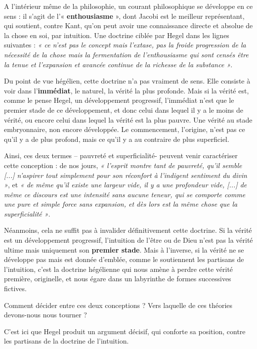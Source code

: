 A l’intérieur même de la philosophie, un courant philosophique se développe en ce sens : il s’agit de l’« {\bf enthousiasme} », dont Jacobi est le meilleur représentant, qui soutient, contre Kant, qu’on peut avoir une connaissance directe et absolue de la chose en soi, par intuition. Une doctrine ciblée par Hegel dans les lignes suivantes : {\it « ce n’est pas le concept mais l’extase, pas la froide progression de la nécessité de la chose mais la fermentation de l’enthousiasme qui sont censés être la tenue et l’expansion et avancée continue de la richesse de la substance »}.

Du point de vue hégélien, cette doctrine n’a pas vraiment de sens. Elle consiste à voir dans l’{\bf immédiat}, le naturel, la vérité la plus profonde. Mais si la vérité est, comme le pense Hegel, un développement progressif, l’immédiat n’est que le premier stade de ce développement, et donc celui dans lequel il y a le moins de vérité, ou encore celui dans lequel la vérité est la plus pauvre. Une vérité au stade embryonnaire, non encore développée. Le commencement, l’origine, n’est pas ce qu’il y a de plus profond, mais ce qu’il y a au contraire de plus superficiel.

Ainsi, ces deux termes – pauvreté et superficialité- peuvent venir caractériser cette conception : de nos jours, {\it « l’esprit montre tant de pauvreté, qu’il semble [...] n’aspirer tout simplement pour son réconfort à l’indigent sentiment du divin »}, et {\it « de même qu’il existe une largeur vide, il y a une profondeur vide, [...] de même ce discours est une intensité sans aucune teneur, qui se comporte comme une pure et simple force sans expansion, et dès lors est la même chose que la superficialité »}.

Néanmoins, cela ne suffit pas à invalider définitivement cette doctrine. Si la vérité est un développement progressif, l’intuition de l’être ou de Dieu n’est pas la vérité ultime mais uniquement son {\bf premier stade}. Mais à l’inverse, si la vérité ne se développe pas mais est donnée d’emblée, comme le soutiennent les partisans de l’intuition, c’est la doctrine hégélienne qui nous amène à perdre cette vérité première, originelle, et nous égare dans un labyrinthe de formes successives fictives.

Comment décider entre ces deux conceptions ? Vers laquelle de ces théories devons-nous nous tourner ?

C’est ici que Hegel produit un argument décisif, qui conforte sa position, contre les partisans de la doctrine de l’intuition.

